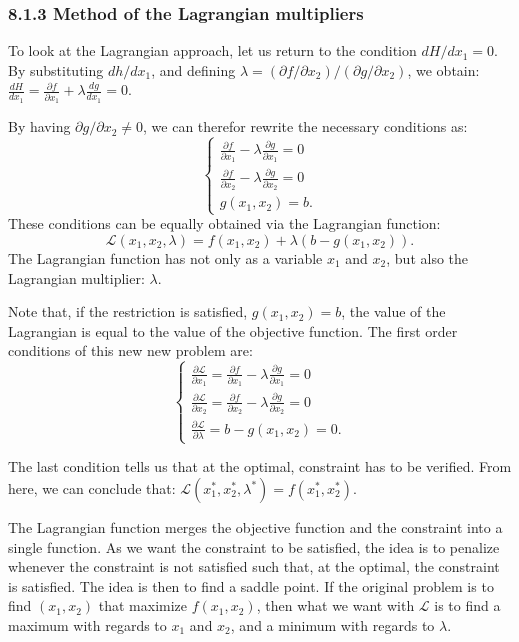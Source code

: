 \documentclass[0pt, a4paper]{article}
\newcommand{\Lagr}{\mathcal{L}}
\begin{document}
\subsubsection*{8.1.3 Method of the Lagrangian multipliers}

To look at the Lagrangian approach, let us return to the condition $dH/dx_1=0$. By substituting $dh/dx_1$, and defining $\lambda=(\partial f/\partial x_2)/(\partial g/\partial x_2)$, we obtain: $\frac{dH}{dx_1}=\frac{\partial f}{\partial x_1}+\lambda\frac{dg}{dx_1}=0$.

By having $\partial g/\partial x_2\neq0$, we can therefor rewrite the necessary conditions as:
$$
\begin{cases}
\frac{\partial f}{\partial x_1}-\lambda\frac{\partial g}{\partial x_1}=0\\
\frac{\partial f}{\partial x_2}-\lambda\frac{\partial g}{\partial x_2}=0\\
g(x_1,x_2)=b.
\end{cases}
$$
These conditions can be equally obtained via the Lagrangian function:
$$\Lagr(x_1,x_2,\lambda)=f(x_1,x_2)+\lambda(b-g(x_1,x_2)).$$ 
The Lagrangian function has not only as a variable $x_1$ and $x_2$, but also the Lagrangian multiplier: $\lambda$.

Note that, if the restriction is satisfied, $g(x_1,x_2)=b$, the value of the Lagrangian is equal to the value of the objective function. The first order conditions of this new new problem are:
$$
\begin{cases}
\frac{\partial \Lagr}{\partial x_1}=\frac{\partial f}{\partial x_1}-\lambda\frac{\partial g}{\partial x_1}=0\\
\frac{\partial \Lagr}{\partial x_2}=\frac{\partial f}{\partial x_2}-\lambda\frac{\partial g}{\partial x_2}=0\\
\frac{\partial \Lagr}{\partial \lambda}=b-g(x_1,x_2)=0.
\end{cases}
$$

The last condition tells us that at the optimal, constraint has to be verified. From here, we can conclude that: $\Lagr(x_1^*,x_2^*,\lambda^*)=f(x_1^*,x_2^*)$.

The Lagrangian function merges the objective function and the constraint into a single function. As we want the constraint to be satisfied, the idea is to penalize whenever the constraint is not satisfied such that, at the optimal, the constraint is satisfied. The idea is then to find a saddle point. If the original problem is to find $(x_1,x_2)$ that maximize $f(x_1,x_2)$, then what we want with $\Lagr$ is to find a maximum with regards to $x_1$ and $x_2$, and a minimum with regards to $\lambda$.
\end{document}

